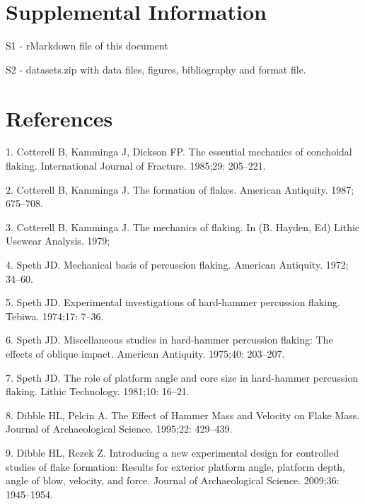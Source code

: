 \documentclass[10pt,letterpaper]{article}
\newenvironment{cslreferences}%
  {}%
  {\par}
\begin{document}
\hypertarget{supplemental-information}{%
\section{Supplemental Information}\label{supplemental-information}}

S1 - rMarkdown file of this document

S2 - datasets.zip with data files, figures, bibliography and format
file.

\hypertarget{references}{%
\section*{References}\label{references}}

\hypertarget{refs}{}
\begin{cslreferences}
\leavevmode\hypertarget{ref-cotterell_essential_1985}{}%
1. Cotterell B, Kamminga J, Dickson FP. The essential mechanics of
conchoidal flaking. International Journal of Fracture. 1985;29:
205--221.

\leavevmode\hypertarget{ref-cotterell_formation_1987}{}%
2. Cotterell B, Kamminga J. The formation of flakes. American Antiquity.
1987; 675--708.

\leavevmode\hypertarget{ref-cotterell_mechanics_1979}{}%
3. Cotterell B, Kamminga J. The mechanics of flaking. In (B. Hayden, Ed)
Lithic Usewear Analysis. 1979;

\leavevmode\hypertarget{ref-speth_mechanical_1972}{}%
4. Speth JD. Mechanical basis of percussion flaking. American Antiquity.
1972; 34--60.

\leavevmode\hypertarget{ref-speth_experimental_1974}{}%
5. Speth JD. Experimental investigations of hard-hammer percussion
flaking. Tebiwa. 1974;17: 7--36.

\leavevmode\hypertarget{ref-speth_miscellaneous_1975}{}%
6. Speth JD. Miscellaneous studies in hard-hammer percussion flaking:
The effects of oblique impact. American Antiquity. 1975;40: 203--207.

\leavevmode\hypertarget{ref-speth_role_1981}{}%
7. Speth JD. The role of platform angle and core size in hard-hammer
percussion flaking. Lithic Technology. 1981;10: 16--21.

\leavevmode\hypertarget{ref-dibble_effect_1995}{}%
8. Dibble HL, Pelcin A. The Effect of Hammer Mass and Velocity on Flake
Mass. Journal of Archaeological Science. 1995;22: 429--439.

\leavevmode\hypertarget{ref-dibble_introducing_2009-1}{}%
9. Dibble HL, Rezek Z. Introducing a new experimental design for
controlled studies of flake formation: Results for exterior platform
angle, platform depth, angle of blow, velocity, and force. Journal of
Archaeological Science. 2009;36: 1945--1954.


\end{cslreferences}
\end{document}
